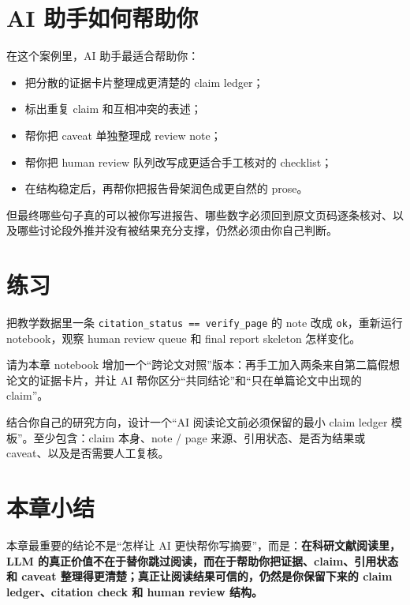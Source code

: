 \section{AI 助手如何帮助你}

在这个案例里，AI 助手最适合帮助你：

\begin{itemize}
    \item 把分散的证据卡片整理成更清楚的 claim ledger；
    \item 标出重复 claim 和互相冲突的表述；
    \item 帮你把 caveat 单独整理成 review note；
    \item 帮你把 human review 队列改写成更适合手工核对的 checklist；
    \item 在结构稳定后，再帮你把报告骨架润色成更自然的 prose。
\end{itemize}

但最终哪些句子真的可以被你写进报告、哪些数字必须回到原文页码逐条核对、以及哪些讨论段外推并没有被结果充分支撑，仍然必须由你自己判断。

\section{练习}

\begin{exercisebox}[基础练习]
把教学数据里一条 \texttt{citation\_status == verify\_page} 的 note 改成 \texttt{ok}，重新运行 notebook，观察 human review queue 和 final report skeleton 怎样变化。
\end{exercisebox}

\begin{exercisebox}[进阶练习]
请为本章 notebook 增加一个“跨论文对照”版本：再手工加入两条来自第二篇假想论文的证据卡片，并让 AI 帮你区分“共同结论”和“只在单篇论文中出现的 claim”。
\end{exercisebox}

\begin{exercisebox}[开放练习]
结合你自己的研究方向，设计一个“AI 阅读论文前必须保留的最小 claim ledger 模板”。至少包含：claim 本身、note / page 来源、引用状态、是否为结果或 caveat、以及是否需要人工复核。
\end{exercisebox}

\section{本章小结}

本章最重要的结论不是“怎样让 AI 更快帮你写摘要”，而是：\textbf{在科研文献阅读里，LLM 的真正价值不在于替你跳过阅读，而在于帮助你把证据、claim、引用状态和 caveat 整理得更清楚；真正让阅读结果可信的，仍然是你保留下来的 claim ledger、citation check 和 human review 结构。}
